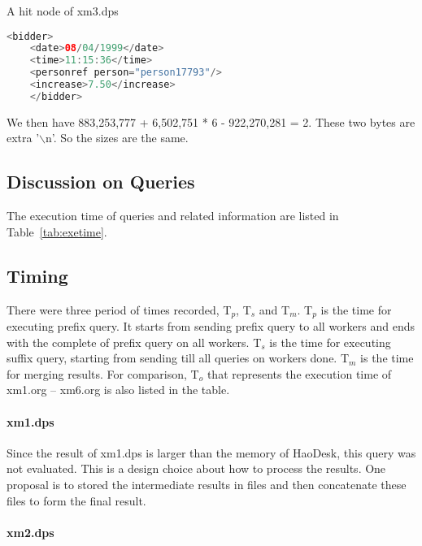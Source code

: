 \begin{table}
	\centering
	\caption{A hit node of xm3.dps}
	\label{tab:bidder}
	\footnotesize
	\begin{lstlisting}[language=java,frame=single]
	<bidder>
	<date>08/04/1999</date>
	<time>11:15:36</time>
	<personref person="person17793"/>
	<increase>7.50</increase>
	</bidder>
	\end{lstlisting}
\end{table}



We then have 883,253,777 + 6,502,751 * 6 - 922,270,281 = 2. These two bytes are
extra '$\backslash$n'. So the sizes are the same.



\subsection{Discussion on Queries}

The execution time of queries and related information are listed in
Table~\ref{tab:exetime}.

\subsection{Timing}

There were three period of times recorded, T$_p$, T$_s$ and T$_m$. T$_p$ is the
time for executing prefix query. It starts from sending  prefix query to all
workers and ends with the complete of prefix query on all workers.
T$_s$ is the time for executing suffix query, starting from sending till all
queries on workers done. T$_m$ is the time for merging results.
For comparison, T$_o$ that represents the execution time of xm1.org -- xm6.org 
is also listed in the table.

\paragraph{xm1.dps}

Since the result of xm1.dps is larger than the memory of HaoDesk, this query 
was not evaluated. This is a design choice about how to process the results. 
One proposal is to stored the intermediate results in files and then 
concatenate these files to form the final result.

\paragraph{xm2.dps}

